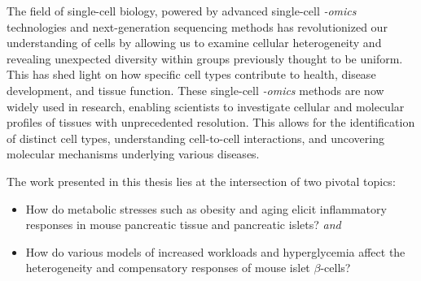  \par The field of single-cell biology, powered by advanced single-cell \textit{-omics} technologies and next-generation sequencing methods has revolutionized our understanding of cells by allowing us to examine cellular heterogeneity and revealing unexpected diversity within groups previously thought to be uniform. This has shed light on how specific cell types contribute to health, disease development, and tissue function. These single-cell \textit{-omics} methods are now widely used in research, enabling scientists to investigate cellular and molecular profiles of tissues with unprecedented resolution. This allows for the identification of distinct cell types, understanding cell-to-cell interactions, and uncovering molecular mechanisms underlying various diseases.\\%
 



\par The work presented in this thesis lies at the intersection of two pivotal topics: 
\begin{itemize}
    \item How do metabolic stresses such as obesity and aging elicit inflammatory responses in mouse pancreatic tissue and pancreatic islets? \textit{and}
    \item How do various models of increased workloads and hyperglycemia affect the heterogeneity and compensatory responses of mouse islet $\beta$-cells?\\
\end{itemize}

